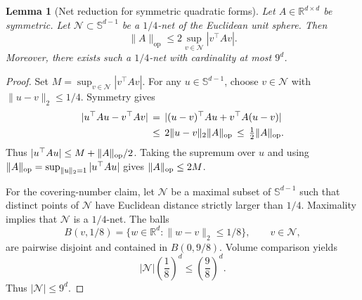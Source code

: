 \documentclass{article} %
\newtheorem{lemma}[theorem]{Lemma}
\begin{document}
\begin{lemma}[Net reduction for symmetric quadratic forms]
\label{lem:err-control-net-reduction-final}
Let \(A\in\mathbb{R}^{d\times d}\) be symmetric.  Let
\(\mathcal{N}\subset\mathbb{S}^{d-1}\) be a \(1/4\)-net of the Euclidean unit
sphere.  Then
\begin{equation}
\|A\|_{\mathrm{op}}
\leq
2\sup_{v\in\mathcal{N}} |v^\top A v|.
\end{equation}
Moreover, there exists such a \(1/4\)-net with cardinality at most \(9^d\).
\end{lemma}

\begin{proof}
Set \(M=\sup_{v\in\mathcal N}|v^\top Av|\). For any
\(u\in\mathbb S^{d-1}\), choose \(v\in\mathcal N\) with
\(\|u-v\|_2\leq1/4\). Symmetry gives
\begin{equation}
\begin{aligned}
|u^\top Au-v^\top Av|
&\,=\,
|(u-v)^\top Au+v^\top A(u-v)|
\\
&\,\leq\,
2\|u-v\|_2\|A\|_{\rm op}
\,\leq\,
\tfrac12\|A\|_{\rm op}.
\end{aligned}
\end{equation}
Thus \(|u^\top Au|\leq M+\|A\|_{\rm op}/2\). Taking the supremum over
\(u\) and using
\(\|A\|_{\rm op}=\sup_{\|u\|_2=1}|u^\top Au|\) gives
\(\|A\|_{\rm op}\leq2M\).

For the covering-number claim, let \(\mathcal{N}\) be a maximal subset of
\(\mathbb{S}^{d-1}\) such that distinct points of \(\mathcal{N}\) have
Euclidean distance strictly larger than \(1/4\).  Maximality implies that
\(\mathcal{N}\) is a \(1/4\)-net. The balls
\begin{equation}
B(v,1/8)=\{w\in\mathbb{R}^d:\|w-v\|_2\le 1/8\},
\qquad v\in\mathcal{N},
\end{equation}
are pairwise disjoint and contained in \(B(0,9/8)\). Volume comparison yields
\begin{equation}
|\mathcal{N}|\left(\frac18\right)^d
\leq
\left(\frac98\right)^d.
\end{equation}
Thus \(|\mathcal{N}|\le 9^d\).
\end{proof}
\end{document}
